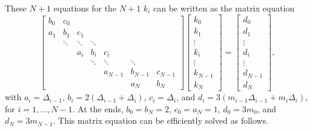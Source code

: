 \begin{sidebar}
\label{sb.solving-tridiagonal-system}
These $N+1$ equations for the $N+1$ $k_{i}$ can be written as the matrix equation
\[
\left[\begin{array}{cccccccccc}
	b_{0} & c_{0} \\
	a_{1} & b_{1} & c_{1} \\
	& \ddots & \ddots & \ddots \\
	& & a_{i} & b_{i} & c_{i} \\
	& & & \ddots & \ddots & \ddots \\
	& & & & a_{N-1} & b_{N-1} & c_{N-1} \\
	& & & & & a_{N} & b_{N} 
\end{array}\right]
\left[\begin{array}{c}
	k_{0}\\
	k_{1}\\
	\vdots\\
	k_{i}\\
	\vdots\\
	k_{N-1}\\
	k_{N}
\end{array}\right] = 
\left[\begin{array}{c}
	d_{0}\\
	d_{1}\\
	\vdots\\
	d_{i}\\
	\vdots\\
	d_{N-1}\\
	d_{N}
\end{array}\right],
\]
with $a_{i} = \Delta_{i-1}$, $b_{i} = 2(\Delta_{i-1}+\Delta_{i})$, $c_{i} = \Delta_{i}$, and $d_{i} = 3(m_{i-1}\Delta_{i-1}+m_{i}\Delta_{i})$, for $i=1,\ldots,N-1$. At the ends, $b_{0}=b_{N}=2$, $c_{0}=a_{N}=1$, $d_{0}=3m_{0}$, and $d_{N}=3m_{N-1}$.
This  matrix equation can be efficiently solved as follows.


\end{sidebar}
